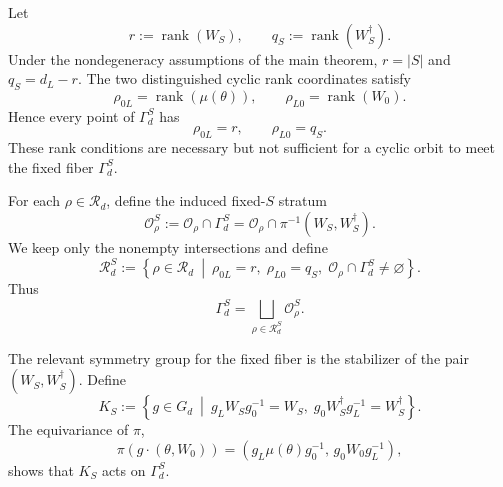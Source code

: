 \documentclass[11pt]{article}
\theoremstyle{definition}
\begin{document}
Let
\[
r:=\operatorname{rank}(W_S),
\qquad
q_S:=\operatorname{rank}(W_S^{\dagger}).
\]
Under the nondegeneracy assumptions of the main theorem, \(r=|S|\) and
\(q_S=d_L-r\). The two distinguished cyclic rank coordinates satisfy
\[
\rho_{0L}=\operatorname{rank}(\mu(\theta)),
\qquad
\rho_{L0}=\operatorname{rank}(W_0).
\]
Hence every point of \(\Gamma_d^S\) has
\[
\rho_{0L}=r,
\qquad
\rho_{L0}=q_S.
\]
These rank conditions are necessary but not sufficient for a cyclic orbit to
meet the fixed fiber \(\Gamma_d^S\).

For each \(\rho\in\mathcal R_d\), define the induced fixed-\(S\) stratum
\[
\mathcal O_\rho^S
:=
\mathcal O_\rho\cap \Gamma_d^S
=
\mathcal O_\rho\cap \pi^{-1}(W_S,W_S^{\dagger}).
\]
We keep only the nonempty intersections and define
\[
\mathcal R_d^S
:=
\left\{
\rho\in\mathcal R_d
\ \middle|\
\rho_{0L}=r,\;
\rho_{L0}=q_S,\;
\mathcal O_\rho\cap\Gamma_d^S\neq\varnothing
\right\}.
\]
Thus
\[
\Gamma_d^S
=
\bigsqcup_{\rho\in\mathcal R_d^S}\mathcal O_\rho^S.
\]

The relevant symmetry group for the fixed fiber is the stabilizer of the pair
\((W_S,W_S^{\dagger})\). Define
\[
K_S
:=
\left\{
g\in G_d
\ \middle|\
g_L W_Sg_0^{-1}=W_S,\;
g_0 W_S^{\dagger}g_L^{-1}=W_S^{\dagger}
\right\}.
\]
The equivariance of \(\pi\),
\[
\pi(g\cdot(\theta,W_0))
=
(g_L\mu(\theta)g_0^{-1},\,g_0 W_0g_L^{-1}),
\]
shows that \(K_S\) acts on \(\Gamma_d^S\).
\end{document}

